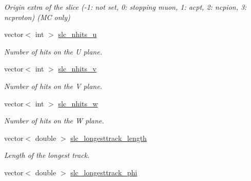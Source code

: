 \begin{DoxyCompactItemize}
\begin{DoxyCompactList}\small\item\em Origin extra of the slice (-\/1\-: not set, 0\-: stopping muon, 1\-: acpt, 2\-: ncpion, 3\-: ncproton) (M\-C only) \end{DoxyCompactList}\item 
\hypertarget{classUBXSecEvent_a52bec741eadb5ef5f4bf1c2322707d20}{vector$<$ int $>$ \hyperlink{classUBXSecEvent_a52bec741eadb5ef5f4bf1c2322707d20}{slc\-\_\-nhits\-\_\-u}}\label{classUBXSecEvent_a52bec741eadb5ef5f4bf1c2322707d20}

\begin{DoxyCompactList}\small\item\em Number of hits on the U plane. \end{DoxyCompactList}\item 
\hypertarget{classUBXSecEvent_a5ade1b25620def646196c0d7fa3ad7f3}{vector$<$ int $>$ \hyperlink{classUBXSecEvent_a5ade1b25620def646196c0d7fa3ad7f3}{slc\-\_\-nhits\-\_\-v}}\label{classUBXSecEvent_a5ade1b25620def646196c0d7fa3ad7f3}

\begin{DoxyCompactList}\small\item\em Number of hits on the V plane. \end{DoxyCompactList}\item 
\hypertarget{classUBXSecEvent_ac20d2a610a09c19bb6c10e80ec735b12}{vector$<$ int $>$ \hyperlink{classUBXSecEvent_ac20d2a610a09c19bb6c10e80ec735b12}{slc\-\_\-nhits\-\_\-w}}\label{classUBXSecEvent_ac20d2a610a09c19bb6c10e80ec735b12}

\begin{DoxyCompactList}\small\item\em Number of hits on the W plane. \end{DoxyCompactList}\item 
\hypertarget{classUBXSecEvent_ac3a7dd3d816188675925b73049cddc2a}{vector$<$ double $>$ \hyperlink{classUBXSecEvent_ac3a7dd3d816188675925b73049cddc2a}{slc\-\_\-longesttrack\-\_\-length}}\label{classUBXSecEvent_ac3a7dd3d816188675925b73049cddc2a}

\begin{DoxyCompactList}\small\item\em Length of the longest track. \end{DoxyCompactList}\item 
\hypertarget{classUBXSecEvent_a3d3b0be1ba8321dfa3f19fad27ae654c}{vector$<$ double $>$ \hyperlink{classUBXSecEvent_a3d3b0be1ba8321dfa3f19fad27ae654c}{slc\-\_\-longesttrack\-\_\-phi}}\label{classUBXSecEvent_a3d3b0be1ba8321dfa3f19fad27ae654c}


\end{DoxyCompactItemize}
